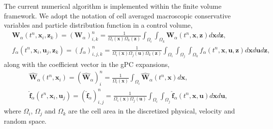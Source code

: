 \documentclass[preprint,3p,12pt,sort&compress]{elsarticle}
\begin{document}
The current numerical algorithm is implemented within the finite volume framework. We adopt the notation of cell averaged macroscopic conservative variables and particle distribution function in a control volume,
\begin{equation*}
\begin{aligned}
&\mathbf W_\alpha({t^n,\mathbf x_i,\mathbf z_k})=(\mathbf W_\alpha)_{i,k}^n=\frac{1}{\Omega_{i}(\mathbf x) \Omega_{k}(\mathbf z)} \int_{\Omega_{i}}\int_{\Omega_{k}} \mathbf W_\alpha(t^n, \mathbf x, \mathbf z)d\mathbf x d\mathbf z,\\
&f_\alpha({t^n,\mathbf x_i,\mathbf u_j,\mathbf z_k})=(f_\alpha)_{i,j,k}^n=\frac{1}{\Omega_{i}(\mathbf x)\Omega_{j}(\mathbf u)\Omega_{k}(\mathbf z)} \int_{\Omega_{i}} \int_{\Omega_{j}} \int_{\Omega_{k}} f_\alpha(t^n,\mathbf x,\mathbf u,\mathbf z) d\mathbf xd\mathbf u d\mathbf z,
\end{aligned}
\end{equation*}
along with the coefficient vector in the gPC expansions,
\begin{equation*}
\begin{aligned}
&\hat {\boldsymbol W}_\alpha (t^n,\mathbf x_i)=(\hat {\boldsymbol W}_\alpha)_{i}^n=\frac{1}{\Omega_{i}(\mathbf x)} \int_{\Omega_{i}} \hat {\boldsymbol W}_\alpha(t^n, \mathbf x)d\mathbf x ,\\
&\hat {\boldsymbol f}_\alpha(t^n,\mathbf x_i,\mathbf u_j)=(\hat {\boldsymbol f}_\alpha)_{i,j}^n=\frac{1}{\Omega_{i}(\mathbf x)\Omega_{j}(\mathbf u)} \int_{\Omega_{i}} \int_{\Omega_{j}}\hat {\boldsymbol f}_\alpha (t^n,\mathbf x,\mathbf u) d\mathbf xd\mathbf u,
\end{aligned}
\end{equation*}
where $\Omega_{i}$, $\Omega_{j}$ and $\Omega_{k}$ are the cell area in the discretized physical, velocity and random space.
\end{document}
